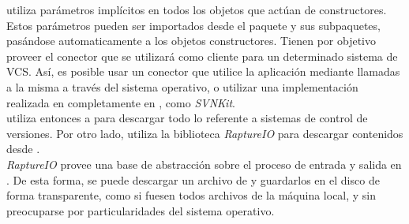 \scalavcs utiliza parámetros implícitos en todos los objetos que actúan de constructores. Estos parámetros pueden ser importados desde el paquete  y sus subpaquetes, pasándose automaticamente a los objetos constructores. Tienen por objetivo proveer el conector que se utilizará como cliente para un determinado sistema de VCS. Así, es posible usar un conector que utilice la aplicación \git mediante llamadas a la misma a través del sistema operativo, o utilizar una implementación realizada en completamente en \java, como \emph{SVNKit}.\\
\fronttier utiliza entonces a \scalavcs para descargar todo lo referente a sistemas de control de versiones. Por otro lado, utiliza la biblioteca \emph{RaptureIO} para descargar contenidos desde \internet.\\
\emph{RaptureIO} provee una base de abstracción sobre el proceso de entrada y salida en \scala. De esta forma, se puede descargar un archivo de \internet y guardarlos en el disco de forma transparente, como si fuesen todos archivos de la máquina local, y sin preocuparse por particularidades del sistema operativo.